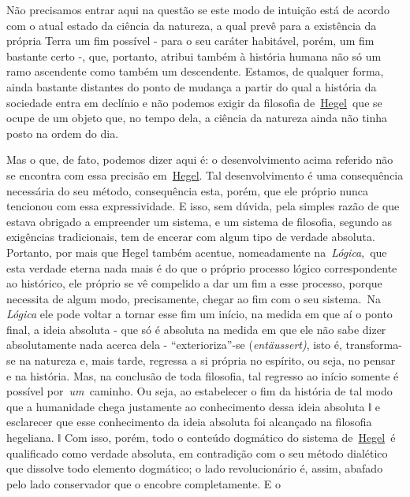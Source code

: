 Não precisamos entrar aqui na questão se este modo de intuição está de
acordo com o atual estado da ciência da natureza, a qual prevê para a
existência da própria Terra um fim possível - para o seu caráter
habitável, porém, um fim bastante certo -, que, portanto, atribui também
à história humana não só um ramo ascendente como também um descendente.
Estamos, de qualquer forma, ainda bastante distantes do ponto de mudança
a partir do qual a história da sociedade entra em declínio e não podemos
exigir da filosofia
de~\href{https://www.marxists.org/portugues/dicionario/verbetes/h/hegel.htm}{Hegel}~que
se ocupe de um objeto que, no tempo dela, a ciência da natureza ainda
não tinha posto na ordem do dia.

Mas o que, de fato, podemos dizer aqui é: o desenvolvimento acima
referido não se encontra com essa precisão
em~\href{https://www.marxists.org/portugues/dicionario/verbetes/h/hegel.htm}{Hegel}.
Tal desenvolvimento é uma consequência necessária do seu método,
consequência esta, porém, que ele próprio nunca tencionou com essa
expressividade. E isso, sem dúvida, pela simples razão de que estava
obrigado a empreender um sistema, e um sistema de filosofia, segundo as
exigências tradicionais, tem de encerar com algum tipo de verdade
absoluta. Portanto, por mais que Hegel também acentue, nomeadamente
na~\emph{Lógica}\protect\hypertarget{r6}{}{},~que esta verdade eterna
nada mais é do que o próprio processo lógico correspondente ao
histórico, ele próprio se vê compelido a dar um fim a esse processo,
porque necessita de algum modo, precisamente, chegar ao fim com o seu
sistema.~Na \emph{Lógica} ele pode voltar a tornar esse fim um início,
na medida em que aí o ponto final, a ideia absoluta - que só é absoluta
na medida em que ele não sabe dizer absolutamente nada acerca dela -
``exterioriza''-se (\emph{entäussert)}, isto é, transforma-se na
natureza e, mais tarde, regressa a si própria no espírito, ou seja, no
pensar e na história. Mas, na conclusão de toda filosofia, tal regresso
ao início somente é possível por~\emph{um~}caminho. Ou seja, ao
estabelecer o fim da história de tal modo que a humanidade chega
justamente ao conhecimento dessa ideia absoluta ǁ e esclarecer que esse
conhecimento da ideia absoluta foi alcançado na filosofia hegeliana. ǁ
Com isso, porém, todo o conteúdo dogmático do sistema
de~\href{https://www.marxists.org/portugues/dicionario/verbetes/h/hegel.htm}{Hegel}~é
qualificado como verdade absoluta, em contradição com o seu método
dialético que dissolve todo elemento dogmático; o lado revolucionário é,
assim, abafado pelo lado conservador que o encobre completamente. E o
